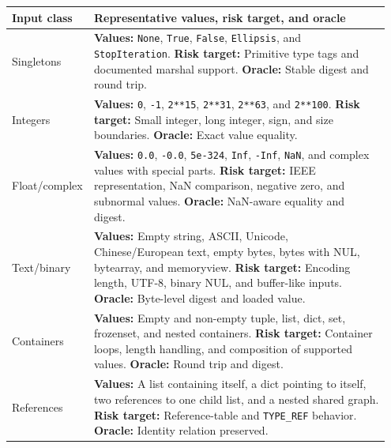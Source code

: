 \documentclass[10pt,a4paper]{article}
\begin{document}
\begin{longtable}{@{}L{0.17\linewidth}L{0.78\linewidth}@{}}
\toprule
\textbf{Input class} & \textbf{Representative values, risk target, and oracle} \\
\midrule

Singletons &
\textbf{Values:} \texttt{None}, \texttt{True}, \texttt{False}, \texttt{Ellipsis}, and \texttt{StopIteration}. \newline
\textbf{Risk target:} Primitive type tags and documented marshal support. \newline
\textbf{Oracle:} Stable digest and round trip. \\

Integers &
\textbf{Values:} \texttt{0}, \texttt{-1}, \texttt{2**15}, \texttt{2**31}, \texttt{2**63}, and \texttt{2**100}. \newline
\textbf{Risk target:} Small integer, long integer, sign, and size boundaries. \newline
\textbf{Oracle:} Exact value equality. \\

Float/complex &
\textbf{Values:} \texttt{0.0}, \texttt{-0.0}, \texttt{5e-324}, \texttt{Inf}, \texttt{-Inf}, \texttt{NaN}, and complex values with special parts. \newline
\textbf{Risk target:} IEEE representation, NaN comparison, negative zero, and subnormal values. \newline
\textbf{Oracle:} NaN-aware equality and digest. \\

Text/binary &
\textbf{Values:} Empty string, ASCII, Unicode, Chinese/European text, empty bytes, bytes with NUL, bytearray, and memoryview. \newline
\textbf{Risk target:} Encoding length, UTF-8, binary NUL, and buffer-like inputs. \newline
\textbf{Oracle:} Byte-level digest and loaded value. \\

Containers &
\textbf{Values:} Empty and non-empty tuple, list, dict, set, frozenset, and nested containers. \newline
\textbf{Risk target:} Container loops, length handling, and composition of supported values. \newline
\textbf{Oracle:} Round trip and digest. \\

References &
\textbf{Values:} A list containing itself, a dict pointing to itself, two references to one child list, and a nested shared graph. \newline
\textbf{Risk target:} Reference-table and \texttt{TYPE\_REF} behavior. \newline
\textbf{Oracle:} Identity relation preserved. \\


\end{longtable}
\end{document}
